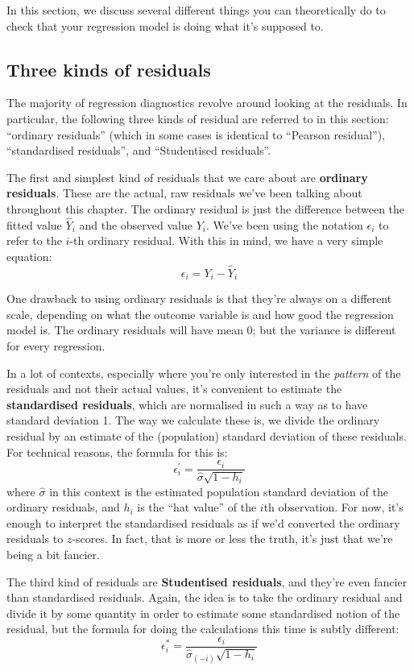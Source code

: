 \documentclass[
]{book}
\theoremstyle{definition}
\theoremstyle{definition}
\theoremstyle{definition}
\theoremstyle{definition}
\theoremstyle{remark}
\begin{document}
In this section, we discuss several different things you can theoretically do to check that your regression model is doing what it's supposed to.

\hypertarget{three-kinds-of-residuals}{%
\subsection{Three kinds of residuals}\label{three-kinds-of-residuals}}

The majority of regression diagnostics revolve around looking at the residuals. In particular, the following three kinds of residual are referred to in this section: ``ordinary residuals'' (which in some cases is identical to ``Pearson residual''), ``standardised residuals'', and ``Studentised residuals''.

The first and simplest kind of residuals that we care about are \textbf{ordinary residuals}. These are the actual, raw residuals we've been talking about throughout this chapter. The ordinary residual is just the difference between the fitted value \(\hat{Y}_i\) and the observed value \(Y_i\). We've been using the notation \(\epsilon_i\) to refer to the \(i\)-th ordinary residual. With this in mind, we have a very simple equation:
\[
\epsilon_i = Y_i - \hat{Y}_i
\]

One drawback to using ordinary residuals is that they're always on a different scale, depending on what the outcome variable is and how good the regression model is. The ordinary residuals will have mean 0; but the variance is different for every regression.

In a lot of contexts, especially where you're only interested in the \emph{pattern} of the residuals and not their actual values, it's convenient to estimate the \textbf{standardised residuals}, which are normalised in such a way as to have standard deviation 1. The way we calculate these is, we divide the ordinary residual by an estimate of the (population) standard deviation of these residuals. For technical reasons, the formula for this is:
\[
\epsilon_{i}^\prime = \frac{\epsilon_i}{\hat{\sigma} \sqrt{1-h_i}}
\]
where \(\hat\sigma\) in this context is the estimated population standard deviation of the ordinary residuals, and \(h_i\) is the ``hat value'' of the \(i\)th observation. For now, it's enough to interpret the standardised residuals as if we'd converted the ordinary residuals to \(z\)-scores. In fact, that is more or less the truth, it's just that we're being a bit fancier.

The third kind of residuals are \textbf{Studentised residuals}, and they're even fancier than standardised residuals. Again, the idea is to take the ordinary residual and divide it by some quantity in order to estimate some standardised notion of the residual, but the formula for doing the calculations this time is subtly different:
\[
\epsilon_{i}^* = \frac{\epsilon_i}{\hat{\sigma}_{(-i)} \sqrt{1-h_i}}
\]
\end{document}
